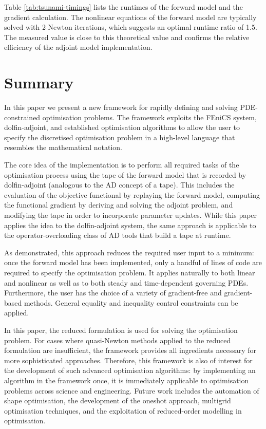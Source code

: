\documentclass[prodmode,acmtoms]{acmsmall}
\newcommand{\fenics}{{\mbox{FEniCS}}\xspace}
\newcommand{\da}{\mbox{{dolfin-adjoint}}\xspace}
\begin{document}
Table \ref{tab:tsunami-timings} lists the runtimes of the forward model and the gradient calculation.
The nonlinear equations of the forward model are typically solved with 2 Newton iterations, 
which suggests an optimal runtime ratio of 1.5. 
The measured value is close to this theoretical value and confirms the relative efficiency of the adjoint model implementation. 




\section{Summary}\label{sec:summary}
In this paper we present a new framework for rapidly defining and solving PDE-constrained optimisation problems.
The framework exploits the \fenics system, \da, and established optimisation algorithms to allow the user
to specify the discretised optimisation problem in a high-level language that resembles the mathematical notation.

The core idea of the implementation is to perform all required tasks of the optimisation process using the tape of the forward model that is recorded by \da 
(analogous to the AD concept of a tape).
This includes the evaluation of the objective functional by replaying the forward model,
computing the functional gradient by deriving and solving the adjoint problem, 
and modifying the tape in order to incorporate parameter updates.
While this paper applies the idea to the \da system, the same approach is applicable to the operator-overloading class of AD tools that build a tape at runtime.

As demonstrated, this approach reduces the required user input to a minimum: once the forward model has been implemented, 
only a handful of lines of code are required to specify the optimisation problem.
It applies naturally to both linear and nonlinear as well as to both steady and time-dependent governing PDEs.
Furthermore, the user has the choice of a variety of gradient-free and gradient-based methods.
General equality and inequality control constraints can be applied.

In this paper, the reduced formulation is used for solving the optimisation problem. 
For cases where quasi-Newton methods applied to the reduced formulation are insufficient, 
the framework provides all ingredients necessary for more sophisticated approaches.
Therefore, this framework is also of interest for the development of such advanced optimisation algorithms: by implementing an algorithm
in the framework once, it is immediately applicable to optimisation problems across science and engineering.
Future work includes the automation of shape optimisation, the development of the oneshot approach, multigrid optimisation techniques, and the exploitation of reduced-order
modelling in optimisation.



\end{document}
